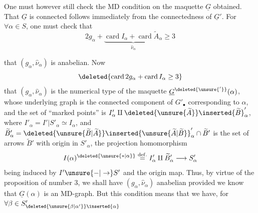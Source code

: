 One must however still check the MD condition on the maquette $\underline G$ obtained. That $\underline G$ is connected follows immediately from the connectedness of $\underline G'$. For $\forall\alpha\in S$, one must check that
\[
2g_\alpha+\underbrace{\operatorname{card}I_\alpha+\operatorname{card}\widetilde A_\alpha}_{\widehat\nu_\alpha}\geq3
\]

 that $(g_\alpha,\widehat\nu_\alpha)$ is anabelian. Now
\[
\deleted{\operatorname{card}2g_\alpha+\operatorname{card}I_\alpha\geq3}
\]
 that $(g_\alpha,\widehat\nu_\alpha)$ is the numerical type of the maquette $\underline G^{\deleted{\unsure{'}}}(\alpha)$, whose underlying graph is the connected component of $G'_\bullet$ corresponding to $\alpha$, and the set of ``marked points'' is $I'_\alpha\amalg\deleted{\unsure{\widetilde A}}\inserted{\widetilde B}'_\alpha$,  where $I'_\alpha=I'|S'_\alpha\simeq I_\alpha$, and $\widetilde B'_\alpha=\deleted{\unsure{\widetilde B|\widetilde A}}\inserted{\unsure{\widetilde A|\widetilde B}}'_\alpha\cap\widetilde B'$ is the set of arrows  $\widetilde B'$ with origin in $S'_\alpha$, the projection homomorphism
\[
I(\alpha)^{\deleted{\unsure{\ast|\alpha}}}\overset{\mathrm{def.}}{=}I'_\alpha\amalg\widetilde B'_\alpha\longrightarrow S'_\alpha
\]
being induced by $I'\unsure{{-}|\to}S'$ and the origin map. Thus, by virtue of the proposition of number 3, we shall have $(g_\alpha,\widehat\nu_\alpha)$ anabelian provided we know that $\underline G(\alpha)$ is an MD-graph. But this condition means that we have, for $\forall\beta\in S'_{\deleted{\unsure{\beta|\alpha'}}\inserted{\alpha}}$
